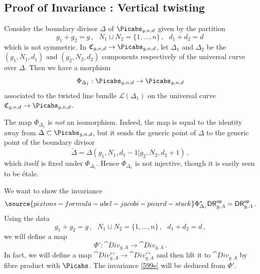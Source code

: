 
\subsection{Proof of Invariance \invnrIII{}: {\rm Vertical twisting}}
Consider the boundary divisor $\Delta$ of $\Picabs_{g,n,d}$ given by the partition
\begin{equation*}
g_1+g_2=g\, , \ \ \ N_1\sqcup N_2 = \{1,\ldots,n\}\,, \ \ \ d_1+d_2=d\,
\end{equation*}
which is not symmetric.
In  $\mathfrak{C}_{g,n,d} \to \Picabs_{g,n,d}$, let $\Delta_1$ and $\Delta_2$ be the $(g_1,N_1,d_1)$
and $(g_2,N_2,d_2)$ components respectively
of the universal curve over $\Delta$.
Then we have a morphism
\[\Phi_{\Delta_1} : \Picabs_{g,n,d} \to \Picabs_{g,n,d}\]
associated to the twisted line bundle $\mathcal{L}(\Delta_1)$ on the universal curve $\mathfrak{C}_{g,n,d} \to \Picabs_{g,n,d}$.

\begin{remark}
\notready
The map $\Phi_{\Delta_1}$ is \emph{not} an isomorphism. Indeed, the map is equal to the identity away from $\Delta \subset \Picabs_{g,n,d}$, but it sends the generic point of $\Delta$ to the generic point of the boundary divisor
$$\widetilde \Delta = \Delta(g_1, N_1, d_1-1|g_2, N_2, d_2+1)\, ,$$ which itself is fixed under $\Phi_{\Delta_1}$. Hence $\Phi_{\Delta_1}$ is not injective, though it is easily seen to be \'etale.
\end{remark}



We want to show the invariance
\begin{equation}\label{599e}
\source{pixtons-formula-abel-jacobi-picard-stack}
\Phi_{\Delta_1}^* \mathsf{DR}^{\mathsf{op}}_{g,A} = \mathsf{DR}^{\mathsf{op}}_{g,A}\, .
\end{equation}
Using the data
\begin{equation*}
g_1+g_2=g\, , \ \ \ N_1\sqcup N_2 = \{1,\ldots,n\}\,, \ \ \ d_1+d_2=d\, ,
\end{equation*}
we will define a map $$\Phi'\colon\cat{Div}_{g,A}\to\cat{Div}_{g,A}\, .$$
In fact, we will define a map $\cat{Div}^{\rel}_{g,A}\to\cat{Div}^{\rel}_{g,A}$ and then lift it to $\cat{Div}_{g,A}$ by fibre product with $\Picabs$.
The invariance \eqref{599e} will be deduced from $\Phi'$.

